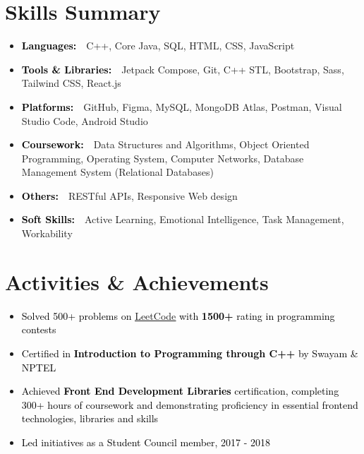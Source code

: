 \documentclass[a4paper,20pt]{article}
\begin{document}
\section{Skills Summary}
\vspace{5pt}
\begin{itemize}[label=\textbullet, labelsep=0.5em, left=0.5em, itemsep=-0.2em]
  \item \textcolor{black}{\textbf{Languages:}}{\small{{~~C++, Core Java, SQL, HTML, CSS, JavaScript}}}
  \item \textcolor{black}{\textbf{Tools \& Libraries:}}{\small{{~~Jetpack Compose, Git, C++ STL, Bootstrap, Sass, Tailwind CSS, React.js}}}
  \item \textcolor{black}{\textbf{Platforms:}}{\small{{~~GitHub, Figma, MySQL, MongoDB Atlas, Postman, Visual Studio Code, Android Studio}}}
  \item \textcolor{black}{\textbf{Coursework:}}{\small{{~~Data Structures and Algorithms, Object Oriented Programming, Operating System, Computer Networks, Database Management System (Relational Databases)}}}
  \item \textcolor{black}{\textbf{Others:}}{\small{{~~RESTful APIs, Responsive Web design}}}
  \item \textcolor{black}{\textbf{Soft Skills:}}{\small{{~~Active Learning, Emotional Intelligence, Task Management, Workability}}}
\end{itemize}
\vspace{2pt}



\section{Activities \& Achievements}
\vspace{2pt}
\begin{itemize}[label=\textbullet, labelsep=0.5em, left=0.5em, itemsep=-0.2em]
  \item \textcolor{black}{Solved 500+ problems on {\href{https://www.leetcode.com/evasabeeh/} {\underline{LeetCode}}} with \textbf{1500+} rating in programming contests}
  \item \textcolor{black}{Certified in \textbf{Introduction to Programming through C++} by Swayam \& NPTEL}
  \item \textcolor{black}{Achieved \textbf{Front End Development Libraries} certification, completing 300+ hours of coursework and demonstrating
  proficiency in essential frontend technologies, libraries and skills}
  \item \textcolor{black}{Led initiatives as a Student Council member, 2017 - 2018}
\end{itemize}
\end{document}

